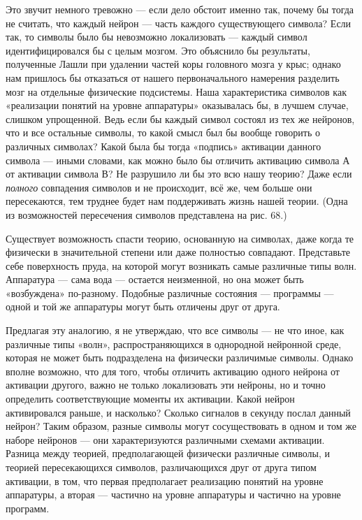 \documentclass[../main.tex]{subfiles}
\begin{document}
Это звучит немного тревожно --- если дело обстоит именно так, почему бы тогда не считать, что каждый нейрон --- часть каждого существующего символа? Если так, то символы было бы невозможно локализовать --- каждый символ идентифицировался бы с целым мозгом. Это объяснило бы результаты, полученные Лашли при удалении частей коры головного мозга у крыс; однако нам пришлось бы отказаться от нашего первоначального намерения разделить мозг на отдельные физические подсистемы. Наша характеристика символов как «реализации понятий на уровне аппаратуры» оказывалась бы, в лучшем случае, слишком упрощенной. Ведь если бы каждый символ состоял из тех же нейронов, что и все остальные символы, то какой смысл был бы вообще говорить о различных символах? Какой была бы тогда «подпись» активации данного символа --- иными словами, как можно было бы отличить активацию символа А от активации символа В? Не разрушило ли бы это всю нашу теорию? Даже если \emph{полного} совпадения символов и не происходит, всё же, чем больше они пересекаются, тем труднее будет нам поддерживать жизнь нашей теории. (Одна из возможностей пересечения символов представлена на рис. 68.)

Существует возможность спасти теорию, основанную на символах, даже когда те физически в значительной степени или даже полностью совпадают. Представьте себе поверхность пруда, на которой могут возникать самые различные типы волн. Аппаратура --- сама вода --- остается неизменной, но она может быть «возбуждена» по-разному. Подобные различные состояния --- программы --- одной и той же аппаратуры могут быть отличены друг от друга.

Предлагая эту аналогию, я не утверждаю, что все символы --- не что иное, как различные типы «волн», распространяющихся в однородной нейронной среде, которая не может быть подразделена на физически различимые символы. Однако вполне возможно, что для того, чтобы отличить активацию одного нейрона от активации другого, важно не только локализовать эти нейроны, но и точно определить соответствующие моменты их активации. Какой нейрон активировался раньше, и насколько? Сколько сигналов в секунду послал данный нейрон? Таким образом, разные символы могут сосуществовать в одном и том же наборе нейронов --- они характеризуются различными схемами активации. Разница между теорией, предполагающей физически различные символы, и теорией пересекающихся символов, различающихся друг от друга типом активации, в том, что первая предполагает реализацию понятий на уровне аппаратуры, а вторая --- частично на уровне аппаратуры и частично на уровне программ.
\end{document}
